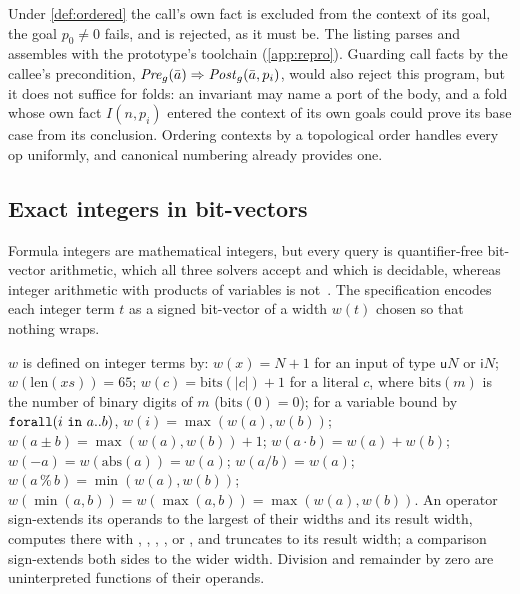 Under \cref{def:ordered} the call's own fact is excluded from the context of its goal, the goal
$p_0\neq0$ fails, and  is rejected, as it must be. The listing parses and assembles with
the prototype's toolchain (\cref{app:repro}). Guarding call facts by the callee's precondition,
$\mathit{Pre}_g(\bar a)\Rightarrow\mathit{Post}_g(\bar a,p_i)$, would also reject this program, but it does not
suffice for folds: an invariant may name a port of the body, and a fold whose own fact
$I(n,p_i)$ entered the context of its own goals could prove its base case from its conclusion.
Ordering contexts by a topological order handles every op uniformly, and canonical numbering
already provides one.

\subsection{Exact integers in bit-vectors}

Formula integers are mathematical integers, but every query is quantifier-free bit-vector
arithmetic, which all three solvers accept and which is decidable, whereas integer arithmetic
with products of variables is not~\cite{matiyasevich1970}. The specification encodes each
integer term $t$ as a signed bit-vector of a width $w(t)$ chosen so that nothing wraps.

\begin{definition}[Widths]\label{def:widths}
$w$ is defined on integer terms by: $w(x)=N+1$ for an input of type $\mathsf{u}N$ or
$\mathsf{i}N$; $w(\mathrm{len}(xs))=65$; $w(c)=\mathrm{bits}(|c|)+1$ for a literal $c$, where
$\mathrm{bits}(m)$ is the number of binary digits of $m$ ($\mathrm{bits}(0)=0$); for a variable
bound by $\kw{forall}(i\ \kw{in}\ a..b)$, $w(i)=\max(w(a),w(b))$;
$w(a\pm b)=\max(w(a),w(b))+1$; $w(a\cdot b)=w(a)+w(b)$; $w(-a)=w(\mathrm{abs}(a))=w(a)$;
$w(a/b)=w(a)$; $w(a\mathbin{\%}b)=\min(w(a),w(b))$; $w(\min(a,b))=w(\max(a,b))=\max(w(a),w(b))$.
An operator sign-extends its operands to the largest of their widths and its result width,
computes there with , , , ,  or
, and truncates to its result width; a comparison sign-extends both sides to the
wider width. Division and remainder by zero are uninterpreted functions of their operands.
\end{definition}

